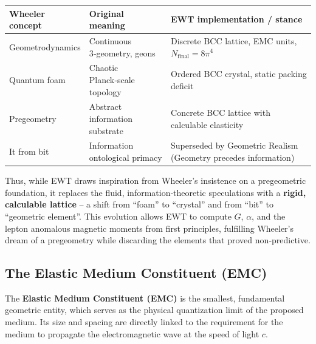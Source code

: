 \documentclass[10pt,a4paper]{article}
\begin{document}
\bigskip
\noindent
\begin{tabular}{lp{5cm}p{6cm}}
	\toprule
	\textbf{Wheeler concept} & \textbf{Original meaning} & \textbf{EWT implementation / stance} \\
	\midrule
	Geometrodynamics & Continuous 3‑geometry, geons & Discrete BCC lattice, EMC units, $N_{\text{final}}=8\pi^4$ \\
	Quantum foam & Chaotic Planck‑scale topology & Ordered BCC crystal, static packing deficit \\
	Pregeometry & Abstract information substrate & Concrete BCC lattice with calculable elasticity \\
	It from bit & Information ontological primacy & Superseded by Geometric Realism (Geometry precedes information) \\
	\bottomrule
\end{tabular}

\bigskip
\noindent
Thus, while EWT draws inspiration from Wheeler's insistence 
on a pregeometric foundation, it replaces the fluid, 
information‑theoretic speculations with a \textbf{rigid, 
	calculable lattice} – a shift from ``foam'' to ``crystal'' 
and from ``bit'' to ``geometric element''. This evolution 
allows EWT to compute $G$, $\alpha$, and the lepton anomalous 
magnetic moments from first principles, fulfilling Wheeler's 
dream of a pregeometry while discarding the elements that 
proved non‑predictive.

\subsection{The Elastic Medium Constituent (EMC)}

The \textbf{Elastic Medium Constituent (EMC)} is the smallest, fundamental geometric entity, which serves as the physical quantization limit of the proposed medium. Its size and spacing are directly linked to the requirement for the medium to propagate the electromagnetic wave at the speed of light $c$.
\end{document}
